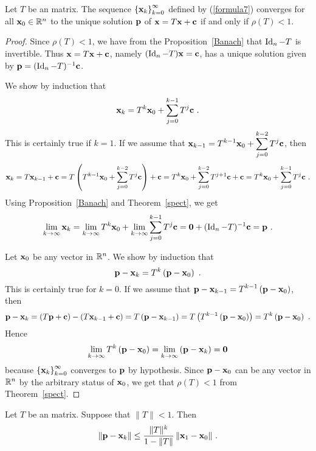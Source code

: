 \begin{theorem}
Let $T$ be an \nn matrix.  The sequence
$\left\{\mathbf{x}_{k}\right\}_{k=0}^\infty$ defined by
(\ref{formula7}) converges for all $\mathbf{x}_{0} \in \mathbb{R}^n$ to the
unique solution $\mathbf{p}$ of $\mathbf{x} = T\mathbf{x} + \mathbf{c}$ if and
only if $\rho(T) < 1$.
\label{convth}
\end{theorem}

\begin{proof}
\stage{$\Leftarrow$} Since $\rho(T) <1$, we have from the
Proposition~\ref{Banach} that $\operatorname{Id}_n-T$ is invertible.  Thus
$\mathbf{x} = T\mathbf{x} + \mathbf{c}$, namely $(\operatorname{Id}_n-T)\mathbf{x} = \mathbf{c}$,
has a unique solution given by $\mathbf{p} = (\operatorname{Id}_n-T)^{-1}\mathbf{c}$.

We show by induction that
\[
\mathbf{x}_{k} = T^k\mathbf{x}_{0} + \sum_{j=0}^{k-1} T^j \mathbf{c} \ .
\]
This is certainly true if $k=1$.  If we assume that
$\displaystyle 
\mathbf{x}_{k-1} = T^{k-1}\mathbf{x}_{0} + \sum_{j=0}^{k-2} T^j \mathbf{c}$,
then
\[
\mathbf{x}_{k} = T\mathbf{x}_{k-1} + \mathbf{c}
= T \left( T^{k-1}\mathbf{x}_{0} + \sum_{j=0}^{k-2} T^j \mathbf{c} \right)
+ \mathbf{c}
= T^k\mathbf{x}_{0} + \sum_{j=0}^{k-2} T^{j+1} \mathbf{c} + \mathbf{c}
= T^k\mathbf{x}_{0} + \sum_{j=0}^{k-1} T^j \mathbf{c} \ .
\]
Using Proposition~\ref{Banach} and Theorem~\ref{spect}, we get
\[
\lim_{k\rightarrow \infty} \mathbf{x}_{k} =
\lim_{k\rightarrow \infty} T^k\mathbf{x}_{0} +
\lim_{k\rightarrow \infty} \sum_{j=0}^{k-1} T^j \mathbf{c}
= \mathbf{0} + (\operatorname{Id}_n - T)^{-1}\mathbf{c} = \mathbf{p} \ .
\]

\stage{$\Rightarrow$} Let $\mathbf{x}_{0}$ be any vector in $\mathbb{R}^n$.
We show by induction that
\[
\mathbf{p} - \mathbf{x}_{k} = T^k\left(\mathbf{p} - \mathbf{x}_{0}\right) \ .
\]
This is certainly true for $k=0$.  If we assume that
$\displaystyle
\mathbf{p} - \mathbf{x}_{k-1} = T^{k-1}\left(\mathbf{p} - \mathbf{x}_{0}\right)$,
then
\[
\mathbf{p} - \mathbf{x}_{k} = \left(T\mathbf{p} + \mathbf{c}\right) -
  \left(T\mathbf{x}_{k-1} + \mathbf{c}\right)
= T \left( \mathbf{p} - \mathbf{x}_{k-1} \right)
= T \left( T^{k-1}\left(\mathbf{p} - \mathbf{x}_{0}\right)\right)
= T^k\left(\mathbf{p} - \mathbf{x}_{0}\right) \ .
\]
Hence
\[
\lim_{k\rightarrow \infty} T^k\left(\mathbf{p} - \mathbf{x}_{0}\right)
= \lim_{k\rightarrow \infty} \left(\mathbf{p} -\mathbf{x}_{k}\right)
= \mathbf{0}
\]
because $\left\{\mathbf{x}_{k}\right\}_{k=0}^\infty$ converges to $\mathbf{p}$
by hypothesis.  Since $\mathbf{p} - \mathbf{x}_{0}$ can be any vector in
$\mathbb{R}^n$ by the arbitrary status of $\mathbf{x}_0$, we get that
$\rho(T) < 1$ from Theorem~\ref{spect}. 
\end{proof}

\begin{cor}
Let $T$ be an \nn matrix.  Suppose that $\|T\| <1$.  Then
\[
\| \mathbf{p} - \mathbf{x}_{k} \| \leq \frac{\| T \|^k}{1 - \| T \|} \,
\| \mathbf{x}_{1} - \mathbf{x}_{0} \| \ .
\]
\end{cor}

